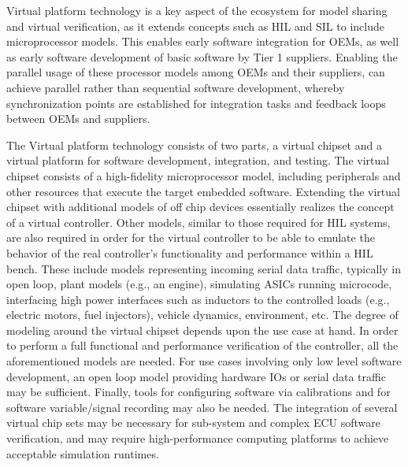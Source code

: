 Virtual platform technology is a key aspect of the ecosystem for model sharing and virtual verification,
as it extends concepts such as HIL and SIL to include microprocessor models.
This enables early software integration for OEMs,
as well as early software development of basic software by Tier 1 suppliers.
Enabling the parallel usage of these processor models among OEMs and their suppliers,
can achieve parallel rather than sequential software development,
whereby synchronization points are established for integration tasks and feedback loops between OEMs and suppliers.

The Virtual platform technology consists of two parts, a virtual chipset and a virtual platform for software development, integration, and testing.
The virtual chipset consists of a high-fidelity microprocessor model,
including peripherals and other resources that execute the target embedded software.
Extending the virtual chipset with additional models of off chip devices essentially realizes the concept of a virtual controller.
Other models, similar to those required for HIL systems, are also required in order for the virtual controller to be able to emulate the behavior of the real controller's functionality and performance within a HIL bench.
These include models representing incoming serial data traffic, typically in open loop,
plant models (e.g., an engine), simulating ASICs running microcode, interfacing high power interfaces such as inductors to the controlled loads (e.g., electric motors, fuel injectors),
vehicle dynamics, environment, etc.
The degree of modeling around the virtual chipset depends upon the use case at hand.
In order to perform a full functional and performance verification of the controller, all the aforementioned models are needed.
For use cases involving only low level software development, an open loop model providing hardware IOs or serial data traffic may be sufficient.
Finally, tools for configuring software via calibrations and for software variable/signal recording may also be needed.
The integration of several virtual chip sets may be necessary for sub-system and complex ECU software verification, and may require high-performance computing platforms to achieve acceptable simulation runtimes.
